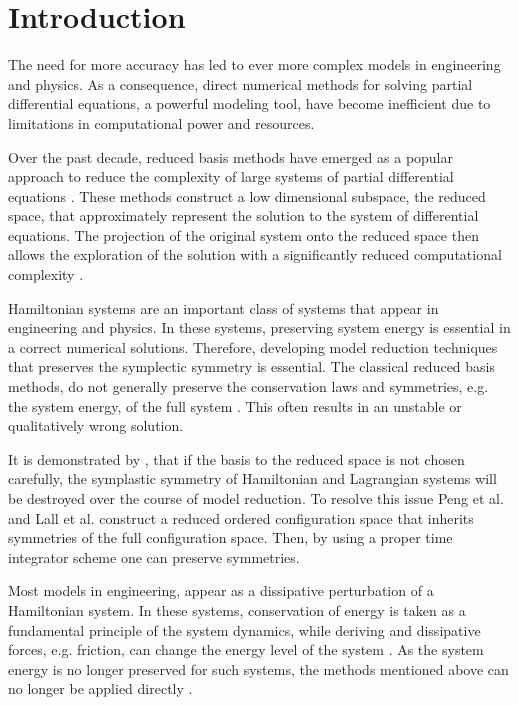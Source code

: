 \section{Introduction} \label{sec:1}

The need for more accuracy has led to ever more complex models in engineering and physics. As a consequence, direct numerical methods for solving partial differential equations, a powerful modeling tool, have become inefficient due to limitations in computational power and resources.

Over the past decade, reduced basis methods have emerged as a popular approach to reduce the complexity of large systems of partial differential equations \cite{Ito:1998up,Ito:1998ch,Ito:2001ev}. These methods construct a low dimensional subspace, the reduced space, that approximately represent the solution to the system of differential equations. The projection of the original system onto the reduced space then allows the exploration of the solution with a significantly reduced computational complexity \cite{hesthaven2015certified,quarteroni2015reduced}.

Hamiltonian systems are an important class of systems that appear in engineering and physics. In these systems, preserving system energy is essential in a correct numerical solutions. Therefore, developing model reduction techniques that preserves the symplectic symmetry is essential. The classical reduced basis methods, do not generally preserve the conservation laws and symmetries, e.g. the system energy, of the full system \cite{Amsallem:2014ef,prajna2003pod}. This often results in an unstable or qualitatively wrong solution. 

It is demonstrated by \cite{Lall:2003iy,Carlberg:2014ky,Peng:2014di}, that if the basis to the reduced space is not chosen carefully, the symplastic symmetry of Hamiltonian and Lagrangian systems will be destroyed over the course of model reduction. To resolve this issue Peng et al. \cite{Peng:2014di} and Lall et al. \cite{Lall:2003iy} construct a reduced ordered configuration space that inherits symmetries of the full configuration space. Then, by using a proper time integrator scheme one can preserve symmetries.

Most models in engineering, appear as a dissipative perturbation of a Hamiltonian system. In these systems, conservation of energy is taken as a fundamental principle of the system dynamics, while deriving and dissipative forces, e.g. friction, can change the energy level of the system \cite{vanderSchaft:2014:PST:2693645.2693646}. As the system energy is no longer preserved for such systems, the methods mentioned above can no longer be applied directly \cite{peng2016geometric}.

